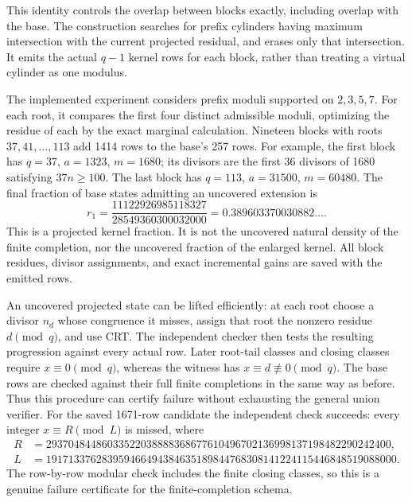 \documentclass[11pt]{article}
\begin{document}
This identity controls the overlap between blocks exactly, including
overlap with the base. The construction searches for prefix cylinders
having maximum intersection with the current projected residual, and
erases only that intersection. It emits the actual $q-1$ kernel rows for
each block, rather than treating a virtual cylinder as one modulus.

The implemented experiment considers prefix moduli supported on $2,3,5,7$.
For each root, it compares the first four distinct admissible moduli,
optimizing the residue of each by the exact marginal calculation.
Nineteen blocks with roots $37,41,\ldots,113$ add 1414 rows to the base's
257 rows. For example, the first block has $q=37$, $a=1323$, $m=1680$;
its divisors are the first 36 divisors of 1680 satisfying $37n\ge100$.
The last block has $q=113$, $a=31500$, $m=60480$.
The final fraction of base states admitting an uncovered extension is
\[
 r_1=\frac{11122926985118327}{28549360300032000}
     =0.389603370030882\ldots.
\]
This is a projected kernel fraction. It is not the uncovered natural
density of the finite completion, nor the uncovered fraction of the
enlarged kernel. All block residues, divisor assignments, and exact
incremental gains are saved with the emitted rows.

An uncovered projected state can be lifted efficiently: at each root
choose a divisor $n_d$ whose congruence it misses, assign that root the
nonzero residue $d\pmod q$, and use CRT. The independent checker then
tests the resulting progression against every actual row. Later root-tail
classes and closing classes require $x\equiv0\pmod q$, whereas the witness
has $x\equiv d\not\equiv0\pmod q$. The base rows are checked against their
full finite completions in the same way as before. Thus this procedure
can certify failure without exhausting the general union verifier.
For the saved 1671-row candidate the independent check succeeds: every
integer $x\equiv R\pmod L$ is missed, where
\begin{align*}
 R&=29370484486033522038888368677610496702136998137198482290242400,\\
 L&=191713376283959466494384635189844768308141224115446848519088000.
\end{align*}
The row-by-row modular check includes the finite closing classes, so this
is a genuine failure certificate for the finite-completion schema.
\end{document}

